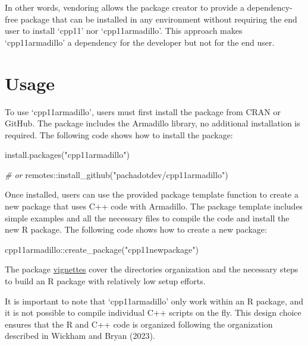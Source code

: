 \documentclass[preprint,12pt]{elsarticle}
\newenvironment{Shaded}{\begin{snugshade}}{\end{snugshade}}
\newcommand{\CommentTok}[1]{\textcolor[rgb]{0.56,0.35,0.01}{\textit{#1}}}
\newcommand{\FunctionTok}[1]{\textcolor[rgb]{0.00,0.00,0.00}{#1}}
\newcommand{\NormalTok}[1]{#1}
\newcommand{\SpecialCharTok}[1]{\textcolor[rgb]{0.00,0.00,0.00}{#1}}
\newcommand{\StringTok}[1]{\textcolor[rgb]{0.31,0.60,0.02}{#1}}
\begin{document}
In other words, vendoring allows the package creator to provide a
dependency-free package that can be installed in any environment without
requiring the end user to install `cpp11' nor `cpp11armadillo'. This
approach makes `cpp11armadillo' a dependency for the developer but not
for the end user.

\section{Usage}\label{usage}

To use `cpp11armadillo', users must first install the package from CRAN
or GitHub. The package includes the Armadillo library, no additional
installation is required. The following code shows how to install the
package:

\begin{Shaded}
\begin{Highlighting}[]
\FunctionTok{install.packages}\NormalTok{(}\StringTok{"cpp11armadillo"}\NormalTok{)}

\CommentTok{\# or}
\NormalTok{remotes}\SpecialCharTok{::}\FunctionTok{install\_github}\NormalTok{(}\StringTok{"pachadotdev/cpp11armadillo"}\NormalTok{)}
\end{Highlighting}
\end{Shaded}

Once installed, users can use the provided package template function to
create a new package that uses C++ code with Armadillo. The package
template includes simple examples and all the necessary files to compile
the code and install the new R package. The following code shows how to
create a new package:

\begin{Shaded}
\begin{Highlighting}[]
\NormalTok{cpp11armadillo}\SpecialCharTok{::}\FunctionTok{create\_package}\NormalTok{(}\StringTok{"cpp11newpackage"}\NormalTok{)}
\end{Highlighting}
\end{Shaded}

The package
\href{https://pacha.dev/cpp11armadillo/index.html}{vignettes} cover the
directories organization and the necessary steps to build an R package
with relatively low setup efforts.

It is important to note that `cpp11armadillo' only work within an R
package, and it is not possible to compile individual C++ scripts on the
fly. This design choice ensures that the R and C++ code is organized
following the organization described in Wickham and Bryan (2023).
\end{document}
